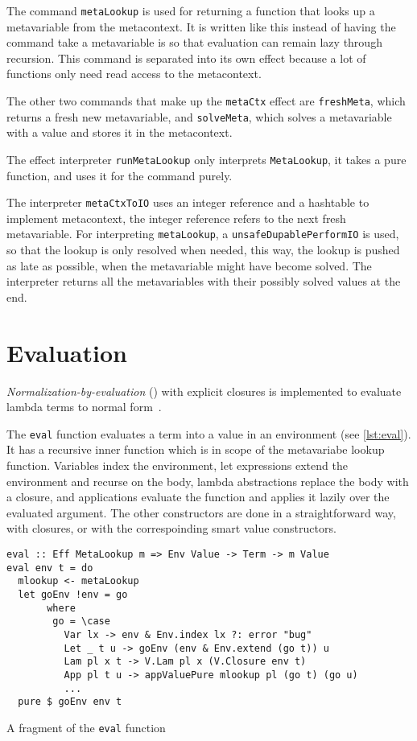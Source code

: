 The command \texttt{metaLookup} is used for returning a function that
looks up a metavariable from the metacontext. It is written like this instead of
having the command take a metavariable is so that evaluation can remain lazy
through recursion. This command is separated into its own effect because a lot
of functions only need read access to the metacontext.

The other two commands that make up the \texttt{metaCtx} effect are
\texttt{freshMeta}, which returns a fresh new metavariable, and
\texttt{solveMeta}, which solves a metavariable with a value and stores
it in the metacontext.

The effect interpreter \texttt{runMetaLookup} only interprets
\texttt{MetaLookup}, it takes a pure function, and uses it for the
command purely.

The interpreter \texttt{metaCtxToIO} uses an integer reference and a
hashtable to implement metacontext, the integer reference refers to the next
fresh metavariable. For interpreting \texttt{metaLookup}, a
\texttt{unsafeDupablePerformIO} is used, so that the lookup is only
resolved when needed, this way, the lookup is pushed as late as possible, when
the metavariable might have become solved. The interpreter returns all the
metavariables with their possibly solved values at the end.

\section{Evaluation}\label{sec:eval}

\emph{Normalization-by-evaluation} () with explicit closures is
implemented to evaluate lambda terms to normal form~\cite{elabzoo, nbe-Abel}.

The \texttt{eval} function evaluates a term into a value in an
environment (see \cref{lst:eval}). It has a recursive inner function which is in
scope of the metavariabe lookup function. Variables index the environment, let
expressions extend the environment and recurse on the body, lambda abstractions
replace the body with a closure, and applications evaluate the function and
applies it lazily over the evaluated argument. The other constructors are done
in a straightforward way, with closures, or with the correspoinding smart value
constructors.

\begin{listing}
  \begin{verbatim}
eval :: Eff MetaLookup m => Env Value -> Term -> m Value
eval env t = do
  mlookup <- metaLookup
  let goEnv !env = go
       where
        go = \case
          Var lx -> env & Env.index lx ?: error "bug"
          Let _ t u -> goEnv (env & Env.extend (go t)) u
          Lam pl x t -> V.Lam pl x (V.Closure env t)
          App pl t u -> appValuePure mlookup pl (go t) (go u)
          ...
  pure $ goEnv env t
  \end{verbatim}
  \caption{A fragment of the \texttt{eval} function}\label{lst:eval}
\end{listing}

